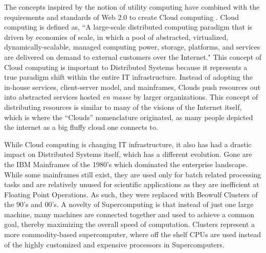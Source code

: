 The concepts inspired by the notion of utility computing have combined with the requirements and standards of Web 2.0 \cite{alexander2006wnw} to create Cloud computing \cite{buyya2008moc, foster2008cca, aboveTheClouds}.  Cloud computing is defined as, ``A large-scale distributed computing paradigm that is driven by economies of scale, in which a pool of abstracted, virtualized, dynamically-scalable, managed computing power, storage, platforms, and services are delivered on demand to external customers over the Internet." This concept of Cloud computing is important to Distributed Systems because it represents a true paradigm shift \cite{kuhn1970structure} within the entire IT infrastructure.  Instead of adopting the in-house services, client-server model, and mainframes, Clouds push resources out into abstracted services hosted \textit{en masse} by larger organizations.  This concept of distributing resources is similar to many of the visions of the Internet itself, which is where the ``Clouds'' nomenclature originated, as many people depicted the internet as a big fluffy cloud one connects to.

While Cloud computing is changing IT infrastructure, it also has had a drastic impact on Distributed Systems itself, which has a different evolution. Gone are the IBM Mainframes of the 1980's which dominated the enterprise landscape.  While some mainframes still exist, they are used only for batch related processing tasks and are relatively unused for scientific applications as they are inefficient at Floating Point Operations.  As such, they were replaced with Beowulf Clusters \cite{sterling2001beowulf} of the 90's and 00's. A novelty of Supercomputing is that instead of just one large machine, many machines are connected together and used to achieve a common goal, thereby maximizing the overall speed of computation.  Clusters represent a more commodity-based supercomputer, where off the shelf CPUs are used instead of the highly customized and expensive processors in Supercomputers.  

